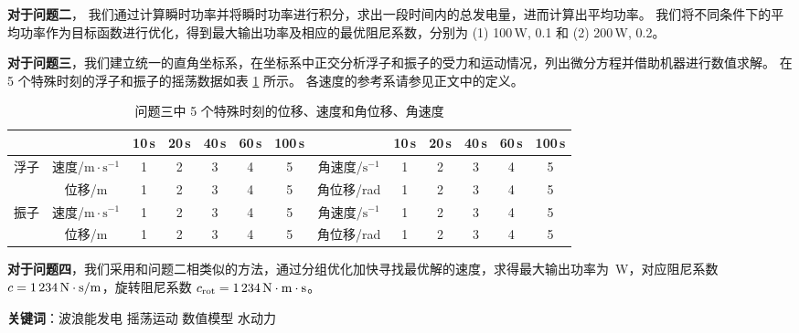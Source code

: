 \textbf{对于问题二}，
我们通过计算瞬时功率并将瞬时功率进行积分，求出一段时间内的总发电量，进而计算出平均功率。
我们将不同条件下的平均功率作为目标函数进行优化，得到最大输出功率及相应的最优阻尼系数，分别为 (1) 100\,W, 0.1 和 (2) 200\,W, 0.2。

\textbf{对于问题三}，我们建立统一的直角坐标系，在坐标系中正交分析浮子和振子的受力和运动情况，列出微分方程并借助机器进行数值求解。
在 5 个特殊时刻的浮子和振子的摇荡数据如表 \ref{answer-3} 所示。
各速度的参考系请参见正文中的定义。

\begin{table}[htbp]
    \centering
    \scriptsize
    \begin{tabular}{ccccccccccccc}
        \toprule
        & & 10\,s & 20\,s & 40\,s & 60\,s & 100\,s & & 10\,s & 20\,s & 40\,s & 60\,s & 100\,s \\
        \midrule
        \multirow{2}{*}{浮子} & 速度/$\mathrm{m}\cdot\mathrm{s}^{-1}$ & 1 & 2 & 3 & 4 & 5 & 角速度/$\mathrm{s}^{-1}$ & 1 & 2 & 3 & 4 & 5 \\
        & 位移/$\mathrm{m}$ & 1 & 2 & 3 & 4 & 5 & 角位移/rad & 1 & 2 & 3 & 4 & 5 \\  
        \multirow{2}{*}{振子} & 速度/$\mathrm{m}\cdot\mathrm{s}^{-1}$ & 1 & 2 & 3 & 4 & 5 & 角速度/$\mathrm{s}^{-1}$ & 1 & 2 & 3 & 4 & 5 \\
        & 位移/$\mathrm{m}$ & 1 & 2 & 3 & 4 & 5 & 角位移/rad & 1 & 2 & 3 & 4 & 5 \\  
        \bottomrule
    \end{tabular}
    \caption{问题三中 5 个特殊时刻的位移、速度和角位移、角速度}
    \label{answer-3}
\end{table}

\textbf{对于问题四}，我们采用和问题二相类似的方法，通过分组优化加快寻找最优解的速度，求得最大输出功率为 \,W，对应阻尼系数 $c=\N{1234}\,\mathrm{N}\cdot\mathrm{s}/\mathrm{m}$，旋转阻尼系数 $c_\text{rot}=\N{1234}\,\mathrm{N}\cdot\mathrm{m}\cdot\mathrm{s}$。

\vfill

\textbf{关键词}：波浪能发电 \hspace{1em} 摇荡运动 \hspace{1em} 数值模型 \hspace{1em} 水动力